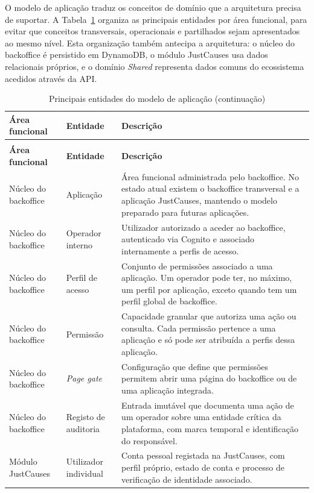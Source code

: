 O modelo de aplicação traduz os conceitos de domínio que a arquitetura precisa de suportar. A Tabela~\ref{tab:entidades_dominio} organiza as principais entidades por área funcional, para evitar que conceitos transversais, operacionais e partilhados sejam apresentados ao mesmo nível. Esta organização também antecipa a arquitetura: o núcleo do backoffice é persistido em DynamoDB, o módulo JustCauses usa dados relacionais próprios, e o domínio \textit{Shared} representa dados comuns do ecossistema acedidos através da \gls{API}.

\begingroup
\small
\begin{longtable}{|p{2.8cm}|p{3.2cm}|p{7cm}|}
\caption{Principais entidades do modelo de aplicação}
\label{tab:entidades_dominio}\\
\hline
\textbf{Área funcional} & \textbf{Entidade} & \textbf{Descrição} \\ \hline
\endfirsthead
\caption[]{Principais entidades do modelo de aplicação (continuação)}\\
\hline
\textbf{Área funcional} & \textbf{Entidade} & \textbf{Descrição} \\ \hline
\endhead
\hline
\endfoot
Núcleo do backoffice & Aplicação & Área funcional administrada pelo backoffice. No estado atual existem o backoffice transversal e a aplicação JustCauses, mantendo o modelo preparado para futuras aplicações. \\ \hline
Núcleo do backoffice & Operador interno & Utilizador autorizado a aceder ao backoffice, autenticado via Cognito e associado internamente a perfis de acesso. \\ \hline
Núcleo do backoffice & Perfil de acesso & Conjunto de permissões associado a uma aplicação. Um operador pode ter, no máximo, um perfil por aplicação, exceto quando tem um perfil global de backoffice. \\ \hline
Núcleo do backoffice & Permissão & Capacidade granular que autoriza uma ação ou consulta. Cada permissão pertence a uma aplicação e só pode ser atribuída a perfis dessa aplicação. \\ \hline
Núcleo do backoffice & \textit{Page gate} & Configuração que define que permissões permitem abrir uma página do backoffice ou de uma aplicação integrada. \\ \hline
Núcleo do backoffice & Registo de auditoria & Entrada imutável que documenta uma ação de um operador sobre uma entidade crítica da plataforma, com marca temporal e identificação do responsável. \\ \hline
Módulo JustCauses & Utilizador individual & Conta pessoal registada na JustCauses, com perfil próprio, estado de conta e processo de verificação de identidade associado. \\ \hline

\end{longtable}
